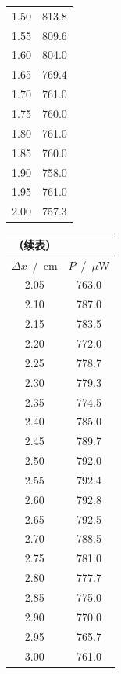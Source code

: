 \documentclass[a4paper]{article}%
\begin{document}
\begin{table}[H]
\begin{minipage}{0.29\linewidth}
\begin{tabular}{cc}
    1.50 	&	813.8 	\\
    1.55 	&	809.6 	\\
    1.60 	&	804.0 	\\
    1.65 	&	769.4 	\\
    1.70 	&	761.0 	\\
    1.75 	&	760.0 	\\
    1.80 	&	761.0 	\\
    1.85 	&	760.0 	\\
    1.90 	&	758.0 	\\
    1.95 	&	761.0 	\\
    2.00 	&	757.3 	\\
    \bottomrule
\end{tabular}
\end{minipage}
\begin{minipage}{0.29\linewidth}
  \centering
  \begin{tabular}{cc}
    （续表）\\
      \toprule
      $\Delta x$~/~cm & $P$~/~$\mu$W\\
      \midrule
      2.05 	&	763.0 	\\
      2.10 	&	787.0 	\\
      2.15 	&	783.5 	\\
      2.20 	&	772.0 	\\
      2.25 	&	778.7 	\\
      2.30 	&	779.3 	\\
      2.35 	&	774.5 	\\
      2.40 	&	785.0 	\\
      2.45 	&	789.7 	\\
      2.50 	&	792.0 	\\
      2.55 	&	792.4 	\\
      2.60 	&	792.8 	\\
      2.65 	&	792.5 	\\
      2.70 	&	788.5 	\\
      2.75 	&	781.0 	\\
      2.80 	&	777.7 	\\
      2.85 	&	775.0 	\\
      2.90 	&	770.0 	\\
      2.95 	&	765.7 	\\
      3.00 	&	761.0 	\\
      \bottomrule
  \end{tabular}
  \end{minipage}
  \begin{minipage}{0.2\linewidth}

\end{minipage}
\end{table}
\end{document}

